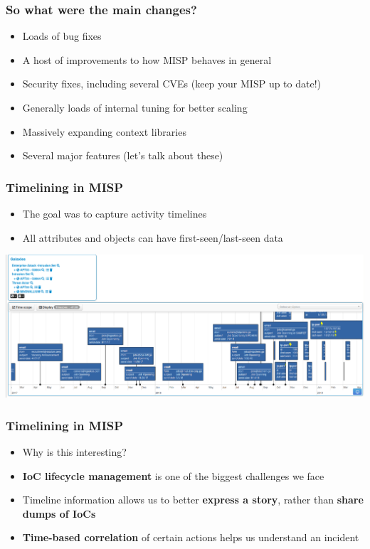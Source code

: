 \begin{frame}
  \frametitle{So what were the main changes?}
  \begin{itemize}
     \item Loads of bug fixes
     \item A host of improvements to how MISP behaves in general
     \item Security fixes, including several CVEs (keep your MISP up to date!)
     \item Generally loads of internal tuning for better scaling
     \item Massively expanding context libraries
     \item Several major features (let's talk about these)
  \end{itemize}
\end{frame}

\begin{frame}
\frametitle{Timelining in MISP}
\begin{itemize}
	\item The goal was to capture activity timelines
        \item All attributes and objects can have first-seen/last-seen data       
\end{itemize}
\includegraphics[scale=0.25]{images/timeline.png}
\end{frame}

\begin{frame}
\frametitle{Timelining in MISP}
\begin{itemize}
	\item Why is this interesting?
        \item {\bf IoC lifecycle management} is one of the biggest challenges we face
        \item Timeline information allows us to better {\bf express a story}, rather than {\bf share dumps of IoCs}
        \item {\bf Time-based correlation} of certain actions helps us understand an incident
\end{itemize}
\end{frame}

